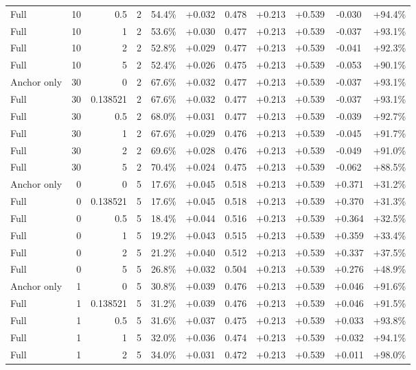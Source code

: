 \begin{table}[htbp]
\begin{tabular}{lrrrccccccc}
Full & 10 & 0.5 & 2 & 54.4\% & +0.032 & 0.478 & +0.213 & +0.539 & -0.030 & +94.4\% \\
Full & 10 & 1 & 2 & 53.6\% & +0.030 & 0.477 & +0.213 & +0.539 & -0.037 & +93.1\% \\
Full & 10 & 2 & 2 & 52.8\% & +0.029 & 0.477 & +0.213 & +0.539 & -0.041 & +92.3\% \\
Full & 10 & 5 & 2 & 52.4\% & +0.026 & 0.475 & +0.213 & +0.539 & -0.053 & +90.1\% \\
Anchor only & 30 & 0 & 2 & 67.6\% & +0.032 & 0.477 & +0.213 & +0.539 & -0.037 & +93.1\% \\
Full & 30 & 0.138521 & 2 & 67.6\% & +0.032 & 0.477 & +0.213 & +0.539 & -0.037 & +93.1\% \\
Full & 30 & 0.5 & 2 & 68.0\% & +0.031 & 0.477 & +0.213 & +0.539 & -0.039 & +92.7\% \\
Full & 30 & 1 & 2 & 67.6\% & +0.029 & 0.476 & +0.213 & +0.539 & -0.045 & +91.7\% \\
Full & 30 & 2 & 2 & 69.6\% & +0.028 & 0.476 & +0.213 & +0.539 & -0.049 & +91.0\% \\
Full & 30 & 5 & 2 & 70.4\% & +0.024 & 0.475 & +0.213 & +0.539 & -0.062 & +88.5\% \\
Anchor only & 0 & 0 & 5 & 17.6\% & +0.045 & 0.518 & +0.213 & +0.539 & +0.371 & +31.2\% \\
Full & 0 & 0.138521 & 5 & 17.6\% & +0.045 & 0.518 & +0.213 & +0.539 & +0.370 & +31.3\% \\
Full & 0 & 0.5 & 5 & 18.4\% & +0.044 & 0.516 & +0.213 & +0.539 & +0.364 & +32.5\% \\
Full & 0 & 1 & 5 & 19.2\% & +0.043 & 0.515 & +0.213 & +0.539 & +0.359 & +33.4\% \\
Full & 0 & 2 & 5 & 21.2\% & +0.040 & 0.512 & +0.213 & +0.539 & +0.337 & +37.5\% \\
Full & 0 & 5 & 5 & 26.8\% & +0.032 & 0.504 & +0.213 & +0.539 & +0.276 & +48.9\% \\
Anchor only & 1 & 0 & 5 & 30.8\% & +0.039 & 0.476 & +0.213 & +0.539 & +0.046 & +91.6\% \\
Full & 1 & 0.138521 & 5 & 31.2\% & +0.039 & 0.476 & +0.213 & +0.539 & +0.046 & +91.5\% \\
Full & 1 & 0.5 & 5 & 31.6\% & +0.037 & 0.475 & +0.213 & +0.539 & +0.033 & +93.8\% \\
Full & 1 & 1 & 5 & 32.0\% & +0.036 & 0.474 & +0.213 & +0.539 & +0.032 & +94.1\% \\
Full & 1 & 2 & 5 & 34.0\% & +0.031 & 0.472 & +0.213 & +0.539 & +0.011 & +98.0\% \\

\end{tabular}
\end{table}
